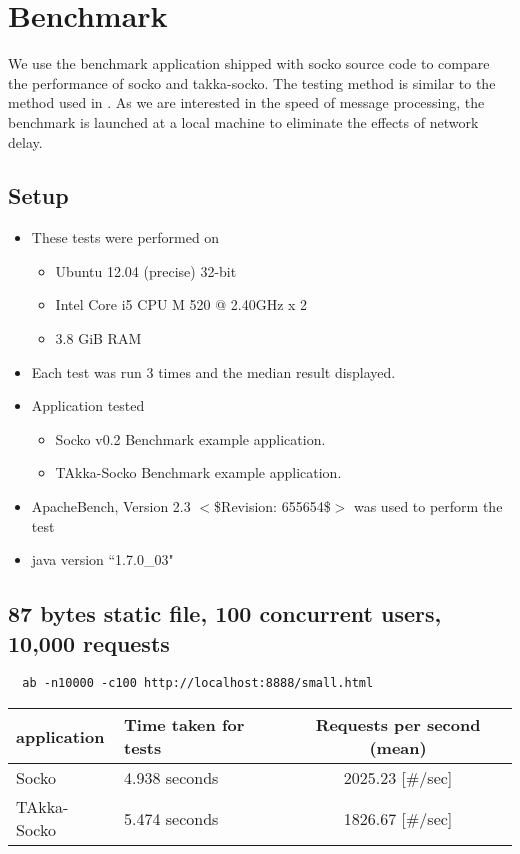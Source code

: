 \documentclass[11pt, a4paper]{article}
\begin{document}
 
\section{Benchmark}\label{benchmark}
We use the benchmark application shipped with socko source code to compare the performance of socko and takka-socko.  The testing method is similar to the method used in \cite{socko-bench}.  As we are interested in the speed of message processing, the benchmark is launched at a local machine to eliminate the effects of network delay.


\subsection{Setup}
\begin{itemize}
  \item These tests were performed on
  \begin{itemize}
    \item Ubuntu 12.04 (precise) 32-bit
    \item Intel Core i5 CPU M 520  @ 2.40GHz x 2
    \item 3.8 GiB RAM
  \end{itemize}
  
  \item Each test was run 3 times and the median result displayed.
  
  \item Application tested
  \begin{itemize}
    \item Socko v0.2 Benchmark example application.
    \item TAkka-Socko Benchmark example application.
  \end{itemize}  
  
  \item ApacheBench, Version 2.3 $<$\$Revision: 655654\$$>$ was used to perform the test
  
  \item java version ``1.7.0\_03"
\end{itemize}

\subsection{87 bytes static file, 100 concurrent users, 10,000 requests}
\begin{verbatim}
  ab -n10000 -c100 http://localhost:8888/small.html
\end{verbatim}
\begin{table}[h]
\begin{tabularx}{\textwidth}{ |l|X|c| }
  \hline
  application    & Time taken for tests & Requests per second (mean)  \\
  \hline
  Socko               & 4.938 seconds           & 2025.23 [\#/sec] \\
  \hline
  TAkka-Socko  & 5.474 seconds           & 1826.67 [\#/sec]  \\
  \hline  
\end{tabularx}
\end{table}
\end{document}
